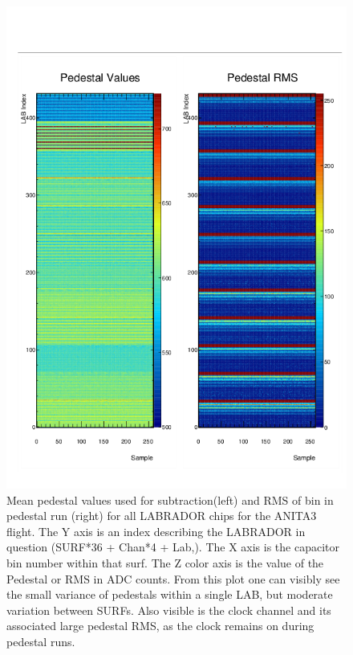 \begin{figure}
	\centering
	\includegraphics[height=0.8\textheight]{figures/Pedestals_big2}
	\caption{Mean pedestal values used for subtraction(left) and RMS of bin in pedestal run (right) for all LABRADOR chips for the ANITA3 flight.  The Y axis is an index describing the LABRADOR in question (SURF*36 + Chan*4 + Lab,).  The X axis is the capacitor bin number within that surf.  The Z color axis is the value of the Pedestal or RMS in ADC counts.  From this plot one can visibly see the small variance of pedestals within a single LAB, but moderate variation between SURFs.  Also visible is the clock channel and its associated large pedestal RMS, as the clock remains on during pedestal runs.}
	\label{fig:pedestals}
\end{figure}	
				
				
